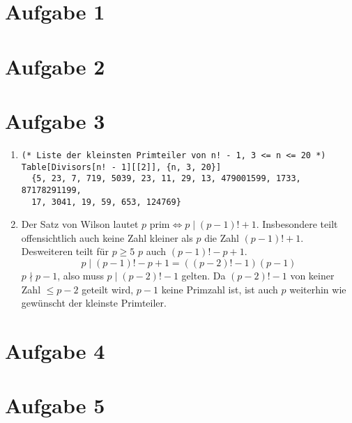 \section*{Aufgabe 1}

\section*{Aufgabe 2}

\section*{Aufgabe 3}
\begin{enumerate}[(1)]
\item 
\lstset{language=Mathematica}
\begin{lstlisting}
(* Liste der kleinsten Primteiler von n! - 1, 3 <= n <= 20 *)
Table[Divisors[n! - 1][[2]], {n, 3, 20}]
  {5, 23, 7, 719, 5039, 23, 11, 29, 13, 479001599, 1733, 87178291199,
  17, 3041, 19, 59, 653, 124769}
\end{lstlisting}
\item Der Satz von Wilson lautet $ p \text{ prim} \Leftrightarrow p \mid (p-1)! + 1 $.
Insbesondere teilt offensichtlich auch keine Zahl kleiner als $p$ die Zahl $  (p-1)! + 1 $. Desweiteren
teilt für $p \geq 5$ $p$ auch $ (p-1)! -  p + 1$.
\[ p \mid (p-1)! - p + 1 = ((p-2)! - 1)(p-1) \]
$p \nmid p-1$, also muss $p \mid (p-2)! - 1 $ gelten. Da $(p-2)!-1$ von keiner Zahl $\leq p-2$ geteilt wird,
$p-1$ keine Primzahl ist, ist auch $p$ weiterhin wie gewünscht der kleinste Primteiler.
\end{enumerate}

\section*{Aufgabe 4}

\section*{Aufgabe 5}